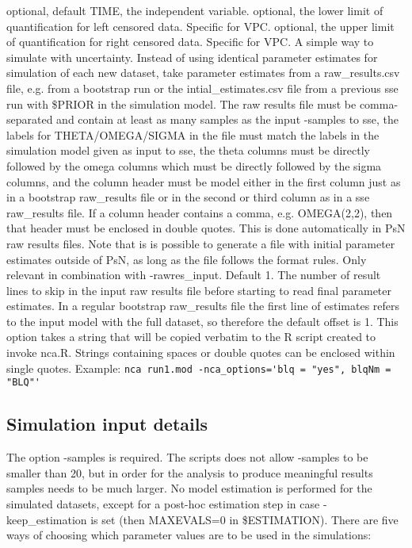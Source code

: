 \begin{optionlist}
\nextopt
{}
optional, default TIME, the independent variable. 
\nextopt
{}
optional, the lower limit of quantification for left censored data. Specific for VPC. 
\nextopt
{}
optional, the upper limit of quantification for right censored data. Specific for VPC. 
\nextopt
{}
A simple way to simulate with uncertainty. Instead of using identical parameter estimates for simulation of each new dataset, take parameter estimates from a raw\_results.csv file, e.g. from a bootstrap run or the intial\_estimates.csv file from a previous sse run with \$PRIOR in the simulation model. The raw results file must be comma-separated and contain at least as many samples as the input -samples to sse, the labels for THETA/OMEGA/SIGMA in the file must match the labels in the simulation model given as input to sse, the theta columns must be directly followed by the omega columns which must be directly followed by the sigma columns, and the column header must be model either in the first column just as in a bootstrap raw\_results file or in the second or third column as in a sse raw\_results file. If a column header contains a comma, e.g. OMEGA(2,2), then that header must be enclosed in double quotes. This is done automatically in PsN raw results files. Note that is is possible to generate a file with initial parameter estimates outside of PsN, as long as the file follows the format rules. 
\nextopt
{}
Only relevant in combination with -rawres\_input. Default 1. The number of result lines to skip in the input raw results file before starting to read final parameter estimates. In a regular bootstrap raw\_results file the first line of estimates refers to the input model with the full dataset, so therefore the default offset is 1. 
\nextopt
{}
This option takes a string that will be copied verbatim to the R script created to invoke nca.R. Strings containing spaces or double quotes can be enclosed within single quotes. Example: \verb|nca run1.mod -nca_options='blq = "yes", blqNm = "BLQ"'|
\nextopt
\end{optionlist}



\subsection{Simulation input details}
The option -samples is required. The scripts does not allow -samples to be smaller than 20, but in order for the analysis to produce meaningful results samples needs to be much larger. No model estimation is performed for the simulated datasets, except for a post-hoc estimation step in case -keep\_estimation is set (then MAXEVALS=0 in \$ESTIMATION). There are five ways of choosing which parameter values are to be used in the simulations: 

